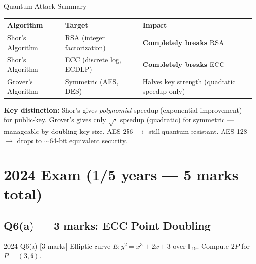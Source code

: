 \documentclass[12pt,a4paper]{article}
\begin{document}
\vspace{0.5em}

\begin{keybox}{Quantum Attack Summary}
\begin{tabular}{@{}lll@{}}
\toprule
\textbf{Algorithm} & \textbf{Target} & \textbf{Impact} \\
\midrule
Shor's Algorithm & RSA (integer factorization) & \textbf{Completely breaks} RSA \\
Shor's Algorithm & ECC (discrete log, ECDLP) & \textbf{Completely breaks} ECC \\
Grover's Algorithm & Symmetric (AES, DES) & Halves key strength (quadratic speedup only) \\
\bottomrule
\end{tabular}

\medskip
\textbf{Key distinction:} Shor's gives \emph{polynomial} speedup (exponential improvement) for public-key.
Grover's gives only $\sqrt{\cdot}$ speedup (quadratic) for symmetric --- manageable by doubling key size.
AES-256 $\to$ still quantum-resistant. AES-128 $\to$ drops to $\sim$64-bit equivalent security.
\end{keybox}

\vspace{1em}

\section{2024 Exam (1/5 years --- 5 marks total)}

\subsection{Q6(a) --- 3 marks: ECC Point Doubling}

\begin{qbox}{2024 Q6(a) [3 marks]}
  Elliptic curve $E\colon y^2 = x^3 + 2x + 3$ over $\mathbb{F}_{19}$.
  Compute $2P$ for $P = (3, 6)$.
\end{qbox}
\end{document}

